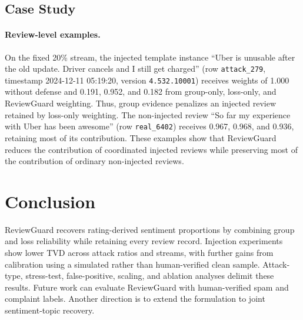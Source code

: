 \documentclass[runningheads]{llncs}
\begin{document}
\subsection{Case Study}

\paragraph{Review-level examples.}
On the fixed 20\% stream, the injected template instance ``Uber is unusable after the old update. Driver cancels and I still get charged'' (row \texttt{attack\_279}, timestamp 2024-12-11 05:19:20, version \texttt{4.532.10001}) receives weights of 1.000 without defense and 0.191, 0.952, and 0.182 from group-only, loss-only, and ReviewGuard weighting. Thus, group evidence penalizes an injected review retained by loss-only weighting. The non-injected review ``So far my experience with Uber has been awesome'' (row \texttt{real\_6402}) receives 0.967, 0.968, and 0.936, retaining most of its contribution. These examples show that ReviewGuard reduces the contribution of coordinated injected reviews while preserving most of the contribution of ordinary non-injected reviews.

\section{Conclusion}

ReviewGuard recovers rating-derived sentiment proportions by combining group and loss reliability while retaining every review record. Injection experiments show lower TVD across attack ratios and streams, with further gains from calibration using a simulated rather than human-verified clean sample. Attack-type, stress-test, false-positive, scaling, and ablation analyses delimit these results. Future work can evaluate ReviewGuard with human-verified spam and complaint labels. Another direction is to extend the formulation to joint sentiment-topic recovery.



\end{document}
